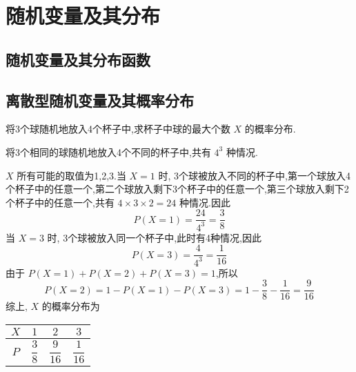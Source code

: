
\chapter{随机变量及其分布}
\thispagestyle{plain}

\section{随机变量及其分布函数}

\section{离散型随机变量及其概率分布}

\question 将3个球随机地放入4个杯子中,求杯子中球的最大个数 $X$ 的概率分布.

\begin{solution}
    将3个相同的球随机地放入4个不同的杯子中,共有 $4^3$ 种情况.
    
    $X$ 所有可能的取值为1,2,3.当 $X=1$ 时, 3个球被放入不同的杯子中,第一个球放入4个杯子中的任意一个,第二个球放入剩下3个杯子中的任意一个,第三个球放入剩下2个杯子中的任意一个,共有 $4 \times 3 \times 2 = 24$ 种情况.因此
    $$
    P(X=1) = \dfrac{24}{4^3} = \dfrac{3}{8}
    $$
    当 $X=3$ 时, 3个球被放入同一个杯子中,此时有4种情况,因此
    $$
    P(X=3) = \dfrac{4}{4^3} = \dfrac{1}{16}
    $$
    由于 $P(X=1) + P(X=2) + P(X=3) = 1$,所以
    $$
    P(X=2) = 1 - P(X=1) - P(X=3) = 1 - \dfrac{3}{8} - \dfrac{1}{16} = \dfrac{9}{16}
    $$
    综上, $X$ 的概率分布为
    \begin{center}
        \begin{tabular}{c | c c c}
            \hline
            $X$ & $1$ & $2$ & $3$ \\
            \hline
            $P$ \rule{0pt}{20pt} & $\dfrac{3}{8}$ & $\dfrac{9}{16}$ & $\dfrac{1}{16}$ \\[6pt]
            \hline
        \end{tabular}
    \end{center}
\end{solution}